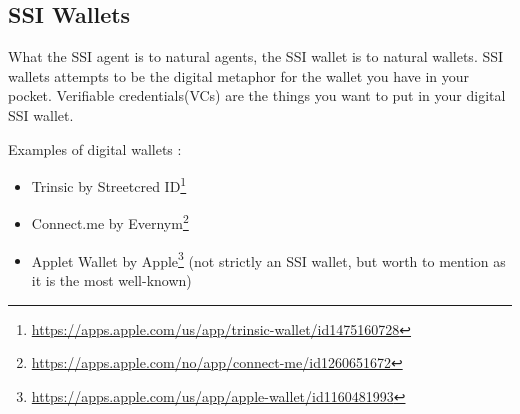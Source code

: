 \hypertarget{ssi-wallets}{%
\subsection{SSI Wallets}\label{ssi-wallets}}

What the SSI agent is to natural agents, the SSI wallet is to natural
wallets. SSI wallets attempts to be the digital metaphor for the wallet
you have in your pocket. Verifiable credentials(VCs) are the things you want
to put in your digital SSI wallet.

Examples of digital wallets :
\begin{itemize}
\tightlist
\item
    Trinsic by Streetcred ID\footnote{\url{https://apps.apple.com/us/app/trinsic-wallet/id1475160728}}
\item
    Connect.me by Evernym\footnote{\url{https://apps.apple.com/no/app/connect-me/id1260651672}}
\item
    Applet Wallet by Apple\footnote{\url{https://apps.apple.com/us/app/apple-wallet/id1160481993}} (not strictly an SSI wallet, but worth to mention as it is the most well-known)
\end{itemize}

